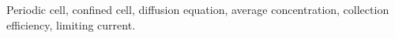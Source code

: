 Periodic cell\sep
confined cell\sep
diffusion equation\sep
average concentration\sep
collection efficiency\sep
limiting current.
